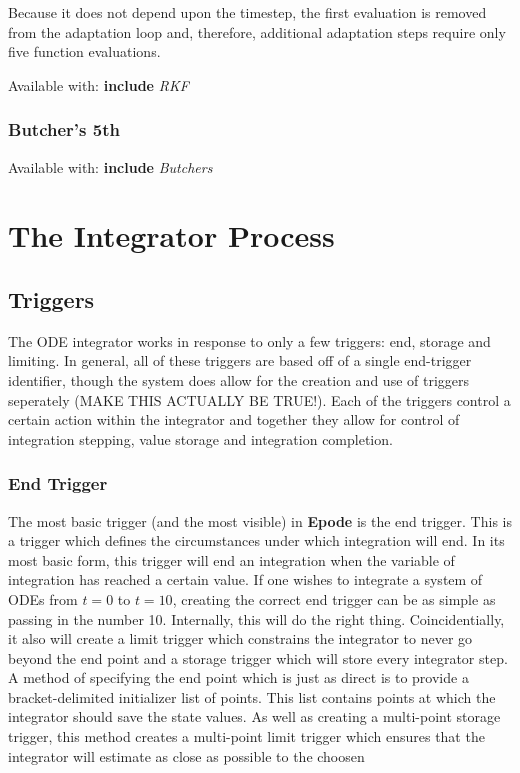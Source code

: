\documentclass[letterpaper,10pt]{book}
\newcommand{\srcas}[1]{Available with: \textbf{include} \textlangle{}\textit{#1}\textrangle{}}
\newcommand{\epode}[0]{\textbf{Epode}}
\begin{document}
	Because it does not depend upon the timestep, the first evaluation is removed from the adaptation loop and, therefore, additional adaptation steps require only five function evaluations.
	
	\srcas{RKF}
    

      \subsection{Butcher's 5th}
	\srcas{Butchers}
    
    

  \chapter{The Integrator Process}
    
    \section{Triggers}
      The ODE integrator works in response to only a few triggers: end, storage and limiting.  In general, all of these triggers are based off of a single end-trigger identifier, though the system does allow for the creation and use of triggers seperately (MAKE THIS ACTUALLY BE TRUE!).  Each of the triggers control a certain action within the integrator and together they allow for control of integration stepping, value storage and integration completion.
      
      \subsection{End Trigger}
	The most basic trigger (and the most visible) in \epode{} is the end trigger.  This is a trigger which defines the circumstances under which integration will end.  In its most basic form, this trigger will end an integration when the variable of integration has reached a certain value.  If one wishes to integrate a system of ODEs from $t=0$ to $t=10$, creating the correct end trigger can be as simple as passing in the number 10.  Internally, this will do the right thing.  Coincidentially, it also will create a limit trigger which constrains the integrator to never go beyond the end point and a storage trigger which will store every integrator step.  A method of specifying the end point which is just as direct is to provide a bracket-delimited initializer list of points.  This list contains points at which the integrator should save the state values.  As well as creating a multi-point storage trigger, this method creates a multi-point limit trigger which ensures that the integrator will estimate as close as possible to the choosen  
    
\end{document}
